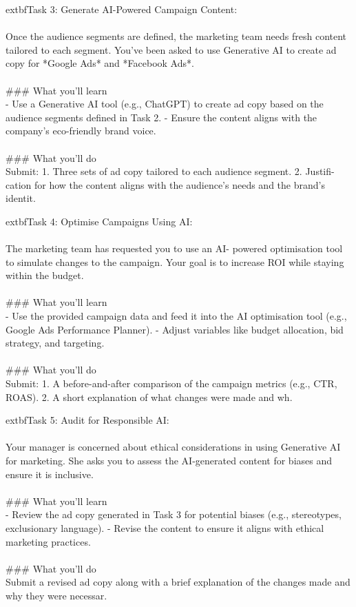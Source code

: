 \documentclass{article}
\begin{document}
	extbf{Task 3:} Generate AI-Powered Campaign Content:  \\
 \\
 Once the audience segments are defined, the marketing team needs fresh content tailored to each segment. You’ve been asked to use Generative AI to create ad copy for *Google Ads* and *Facebook Ads*. \\
 \\
### What you'll learn \\
- Use a Generative AI tool (e.g., ChatGPT) to create ad copy based on the audience segments defined in Task 2. - Ensure the content aligns with the company’s eco-friendly brand voice. \\
 \\
### What you'll do \\
Submit: 1. Three sets of ad copy tailored to each audience segment. 2. Justifi- cation for how the content aligns with the audience’s needs and the brand’s identit.

	extbf{Task 4:} Optimise Campaigns Using AI:  \\
 \\
 The marketing team has requested you to use an AI- powered optimisation tool to simulate changes to the campaign. Your goal is to increase ROI while staying within the budget. \\
 \\
### What you'll learn \\
- Use the provided campaign data and feed it into the AI optimisation tool (e.g., Google Ads Performance Planner). - Adjust variables like budget allocation, bid strategy, and targeting. \\
 \\
### What you'll do \\
Submit: 1. A before-and-after comparison of the campaign metrics (e.g., CTR, ROAS). 2. A short explanation of what changes were made and wh.

	extbf{Task 5:} Audit for Responsible AI:  \\
 \\
 Your manager is concerned about ethical considerations in using Generative AI for marketing. She asks you to assess the AI-generated content for biases and ensure it is inclusive. \\
 \\
### What you'll learn \\
- Review the ad copy generated in Task 3 for potential biases (e.g., stereotypes, exclusionary language). - Revise the content to ensure it aligns with ethical marketing practices. \\
 \\
### What you'll do \\
Submit a revised ad copy along with a brief explanation of the changes made and why they were necessar.
\end{document}
